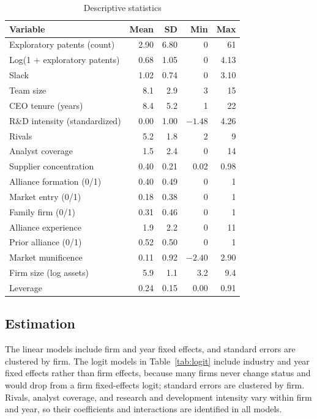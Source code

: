 \documentclass[11pt]{article}
\newcommand{\tn}[1]{\par\vspace{2pt}{\footnotesize #1}}
\begin{document}
\begin{table}[H]
\centering
\caption{Descriptive statistics}\label{tab:desc}
{\small
\begin{tabular}{lrrrr}
\toprule
Variable & Mean & SD & Min & Max \\
\midrule
Exploratory patents (count) & 2.90 & 6.80 & 0 & 61 \\
Log(1 + exploratory patents) & 0.68 & 1.05 & 0 & 4.13 \\
Slack & 1.02 & 0.74 & 0 & 3.10 \\
Team size & 8.1 & 2.9 & 3 & 15 \\
CEO tenure (years) & 8.4 & 5.2 & 1 & 22 \\
R\&D intensity (standardized) & 0.00 & 1.00 & $-1.48$ & 4.26 \\
Rivals & 5.2 & 1.8 & 2 & 9 \\
Analyst coverage & 1.5 & 2.4 & 0 & 14 \\
Supplier concentration & 0.40 & 0.21 & 0.02 & 0.98 \\
Alliance formation (0/1) & 0.40 & 0.49 & 0 & 1 \\
Market entry (0/1) & 0.18 & 0.38 & 0 & 1 \\
Family firm (0/1) & 0.31 & 0.46 & 0 & 1 \\
Alliance experience & 1.9 & 2.2 & 0 & 11 \\
Prior alliance (0/1) & 0.52 & 0.50 & 0 & 1 \\
Market munificence & 0.11 & 0.92 & $-2.40$ & 2.90 \\
Firm size (log assets) & 5.9 & 1.1 & 3.2 & 9.4 \\
Leverage & 0.24 & 0.15 & 0.00 & 0.91 \\
\bottomrule
\end{tabular}}
\tn{Notes: 3,296 firm-years from 412 firms. Fifty-eight percent of firm-years have zero exploratory patents.}
\end{table}

\subsection{Estimation}

The linear models include firm and year fixed effects, and standard errors are clustered by firm. The logit models in Table~\ref{tab:logit} include industry and year fixed effects rather than firm effects, because many firms never change status and would drop from a firm fixed-effects logit; standard errors are clustered by firm. Rivals, analyst coverage, and research and development intensity vary within firm and year, so their coefficients and interactions are identified in all models.
\end{document}
